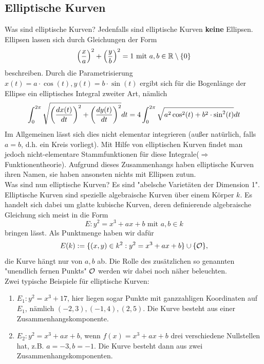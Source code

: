 \subsection*{Elliptische Kurven}
Was sind elliptische Kurven? Jedenfalls sind elliptische Kurven \textbf{keine} Ellipsen. Ellipsen lassen sich durch Gleichungen der Form
\[ \enbrace*{\frac{x}{a}}^2 + \enbrace*{\frac{y}{b}}^2 = 1 \text{ mit } a,b \in \RR \setminus \setnull \]
beschreiben. Durch die Parametrisierung $x(t) = a \cdot \cos(t), y(t) = b \cdot \sin(t)$ ergibt sich für die Bogenlänge der Ellipse ein elliptisches Integral zweiter Art, nämlich
\[ \int_{0}^{2\pi} \sqrt{ \enbrace*{\frac{dx(t)}{dt}}^2 + \enbrace*{\frac{dy(t)}{dt}}^2 } dt = 4 \int_{0}^{2\pi} \sqrt{ a^2 \cos^2(t) + b^2 \cdot \sin^2 (t)} dt \]
Im Allgemeinen lässt sich dies nicht elementar integrieren (außer natürlich, falls $a = b$, d.h. ein Kreis vorliegt). Mit Hilfe von elliptischen Kurven findet man jedoch nicht-elementare Stammfunktionen für diese Integrale\linebreak ($\Rightarrow$ Funktionentheorie). Aufgrund dieses Zusammenhangs haben elliptische Kurven ihren Namen, sie haben ansonsten nichts mit Ellipsen zutun. \\

Was sind nun elliptische Kurven? Es sind "abelsche Varietäten der Dimension 1". Elliptische Kurven sind spezielle algebraische Kurven über einem Körper $k$. Es handelt sich dabei um glatte kubische Kurven, deren definierende algebraische Gleichung sich meist in die Form
\[ E \colon y^2 = x^3 + ax + b \text{ mit } a,b \in k \]
bringen lässt. Als Punktmenge haben wir dafür
\[ E(k) := \{ (x,y) \in k^2 : y^2 = x^3 + ax + b\} \cup \{ \oh \}, \]
die Kurve hängt nur von $a,b$ ab. Die Rolle des zusätzlichen so genannten "unendlich fernen Punkts" $\oh$ werden wir dabei noch näher beleuchten. \\

Zwei typische Beispiele für elliptische Kurven:
\begin{enumerate}[1)]
	\item $E_1\colon y^2 = x^3 + 17$, hier liegen sogar Punkte mit ganzzahligen Koordinaten auf $E_1$, nämlich $(-2,3), (-1,4), (2,5)$. Die Kurve besteht aus einer Zusammenhangskomponente.
	\item $E_2 \colon y^2 = x^3 + ax + b$, wenn $f(x) = x^3 + ax + b$ drei verschiedene Nullstellen hat, z.B. $a = -3, b= -1$. Die Kurve besteht dann aus zwei Zusammenhangskomponenten.
\end{enumerate}

